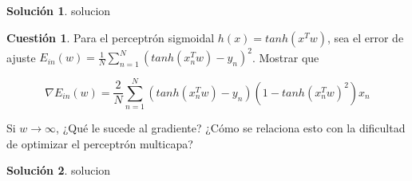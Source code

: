\documentclass[a4paper, 11pt]{article}
\theoremstyle{definition}
\newtheorem{cuestion}{Cuestión}
\newtheorem*{solucion}{Solución}
\begin{document}
  \begin{solucion}
    solucion
  \end{solucion}

  \begin{cuestion}
    Para el perceptrón sigmoidal $h(x) = tanh(x^Tw)$, sea el error de ajuste $E_{in}(w) = \frac{1}{N}\sum_{n=1}^N \left( tanh(x_n^Tw) - y_n \right)^2$. Mostrar que

    $$ \nabla E_{in}(w) = \frac{2}{N} \sum_{n=1}^N \left( tanh(x_n^Tw) - y_n \right) \left( 1 - tanh(x_n^Tw)^2 \right) x_n $$

    Si $w \rightarrow \infty$, ¿Qué le sucede al gradiente? ¿Cómo se relaciona esto con la dificultad de optimizar el perceptrón multicapa?

  \end{cuestion}

  \begin{solucion}
    solucion
  \end{solucion}
\end{document}
